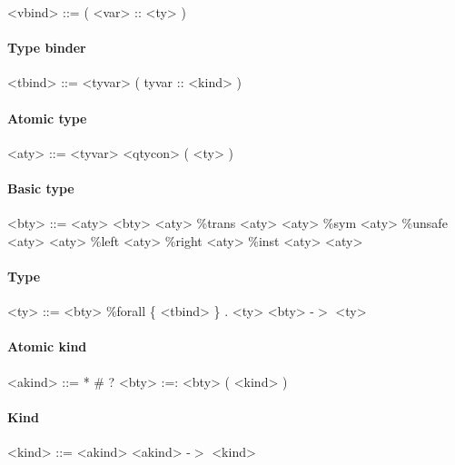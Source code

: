 \begin{grammar}
<vbind> ::= ( <var> :: <ty> )
\end{grammar}

\paragraph{Type binder}

\begin{grammar}
<tbind> ::= <tyvar>
       \alt ( tyvar :: <kind> )
\end{grammar}

\paragraph{Atomic type}

\begin{grammar}
<aty> ::= <tyvar>
     \alt <qtycon>
     \alt ( <ty> )
\end{grammar}

\paragraph{Basic type}

\begin{grammar}
<bty> ::= <aty>
     \alt <bty> <aty>
     \alt \%trans <aty> <aty>
     \alt \%sym <aty>
     \alt \%unsafe <aty> <aty>
     \alt \%left <aty>
     \alt \%right <aty>
     \alt \%inst <aty> <aty>
\end{grammar}

\paragraph{Type}

\begin{grammar}
<ty> ::= <bty>
    \alt \%forall \{ <tbind> \} . <ty>
    \alt <bty> -$>$ <ty>
\end{grammar}

\paragraph{Atomic kind}

\begin{grammar}
<akind> ::= *
       \alt \#
       \alt ?
       \alt <bty> :=: <bty>
       \alt ( <kind> )
\end{grammar}

\paragraph{Kind}

\begin{grammar}
<kind> ::= <akind>
      \alt <akind> -$>$ <kind>
\end{grammar}


